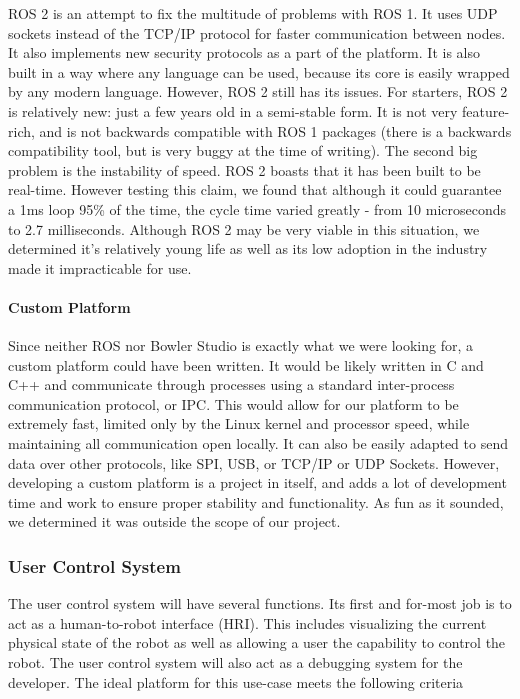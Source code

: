 ROS 2 is an attempt to fix the multitude of problems with ROS 1. It uses UDP sockets instead of the TCP/IP protocol for faster communication between nodes. It also implements new security protocols as a part of the platform. It is also built in a way where any language can be used, because its core is easily wrapped by any modern language. 
However, ROS 2 still has its issues. For starters, ROS 2 is relatively new: just a few years old in a semi-stable form. It is not very feature-rich, and is not backwards compatible with ROS 1 packages (there is a backwards compatibility tool, but is very buggy at the time of writing). The second big problem is the instability of speed. ROS 2 boasts that it has been built to be real-time. However testing this claim, we found that although it could guarantee a 1ms loop 95\% of the time, the cycle time varied greatly - from 10 microseconds to 2.7 milliseconds. Although ROS 2 may be very viable in this situation, we determined it's relatively young life as well as its low adoption in the industry made it impracticable for use.

\paragraph*{Custom Platform}
Since neither ROS nor Bowler Studio is exactly what we were looking for, a custom platform could have been written. It would be likely written in C and C++ and communicate through processes using a standard inter-process communication protocol, or IPC. This would allow for our platform to be extremely fast, limited only by the Linux kernel and processor speed, while maintaining all communication open locally. It can also be easily adapted to send data over other protocols, like SPI, USB, or TCP/IP or UDP Sockets. However, developing a custom platform is a project in itself, and adds a lot of development time and work to ensure proper stability and functionality. As fun as it sounded, we determined it was outside the scope of our project.

\subsubsection{User Control System}
The user control system will have several functions. Its first and for-most job is to act as a human-to-robot interface (HRI). This includes visualizing the current physical state of the robot as well as allowing a user the capability to control the robot. The user control system will also act as a debugging system for the developer. The ideal platform for this use-case meets the following criteria

